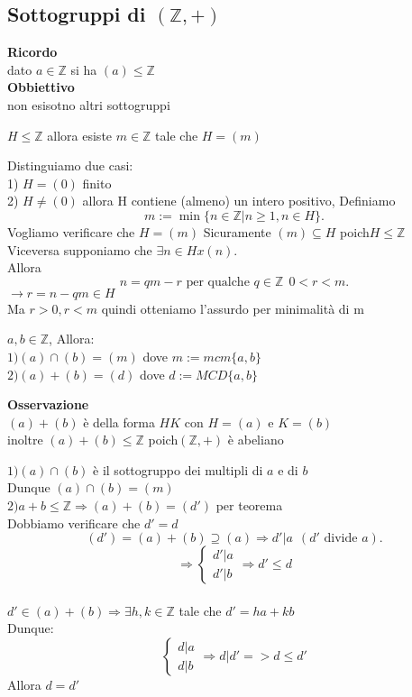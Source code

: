 \documentclass[12px]{article}
\begin{document}
\subsection{Sottogruppi di $(\mathbb Z, +)$}
\textbf{Ricordo}\\
dato $a\in \mathbb Z$ si ha  $(a)\leq \mathbb Z$\\
 \textbf{Obbiettivo}\\
 non esisotno altri sottogruppi
 \begin{teo}
 	$H\leq \mathbb Z$ allora esiste $m\in \mathbb Z$ tale che  $H = (m)$
 \end{teo}
 \begin{dimo}
 	Distinguiamo due casi:\\
	1) $H= (0)$ finito\\
	2) $H\neq(0)$ allora H contiene (almeno) un intero positivo, Definiamo
	\[
		m := \min\lbrace n\in\mathbb Z | n\geq 1, n\in H\rbrace
	.\] 
Vogliamo verificare che $H = (m)$ Sicuramente $(m)\subseteq H$ poich\e $H\leq \mathbb Z$\\
	Viceversa supponiamo che  $\exists n\in Hx(n)$.\\
	Allora
	 \[
		 n = qm - r \text{ per qualche } q\in \mathbb Z \ \ 0 < r < m
	.\] 
	$ \rightarrow r = n - qm \in H$\\
	Ma $r>0, r<m$ quindi otteniamo l'assurdo per minimalità di m

 \end{dimo}
 \begin{prop}
 	$a,b\in \mathbb Z$, Allora:\\
	$1) (a)\cap (b) = (m)$ dove $m := mcm\lbrace a,b\rbrace$\\
	$2) (a) + (b) = (d)$ dove  $d := MCD\lbrace a, b \rbrace$

 \end{prop}
 \textbf{Osservazione}\\ 
 $(a)+(b)$ è della forma $HK$ con $ H = (a)$ e $K = (b)$\\
 inoltre $(a) + (b)\leq \mathbb Z$ poich\e $(\mathbb Z, +)$ è abeliano
 \begin{dimo}
	 $1)(a)\cap (b)$ è il sottogruppo dei multipli di $a$ e di $b$\\
	 Dunque $(a)\cap(b) = (m)$ \\
	 $2)a+b\leq \mathbb Z \Rightarrow (a) + (b) = (d')$ per teorema\\
	 Dobbiamo verificare che $d' = d$ \\
	 \[
		 (d') = (a)+(b)\supseteq (a) \Rightarrow d'|a \ \ ( d'\text{ divide }a)
	 .\] 
	 \[ \Rightarrow  \begin{cases}
	 	d'|a\\
		d'|b
	\end{cases} \Rightarrow d'\leq d\]\\
	 $d'\in (a) + (b) \Rightarrow \exists h,k\in \mathbb Z$ tale che $d' = ha + kb$\\
	 Dunque:\\
	 \[
	  \begin{cases}
	  	d|a\\
		d|b
	  \end{cases} \Rightarrow d|d' => d \leq d'\]
	  Allora $d=d'$
 \end{dimo}
\end{document}
